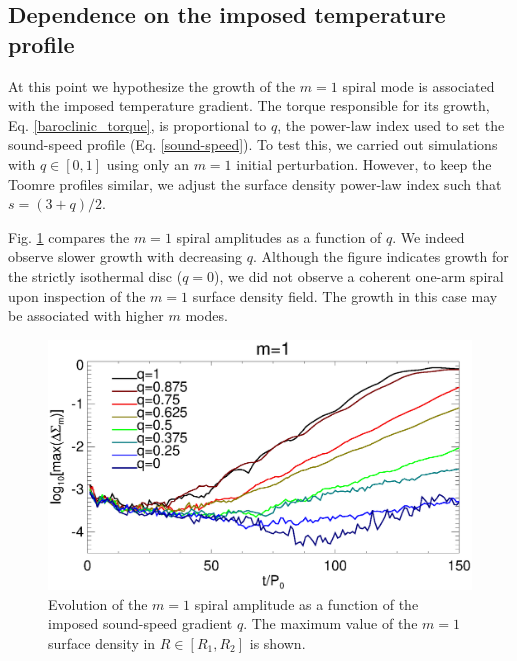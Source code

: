 
\subsection{Dependence on the imposed temperature profile} 
At this point we hypothesize the growth of the $m=1$ spiral mode is
associated with the imposed temperature gradient. The torque
responsible for its growth, Eq. \ref{baroclinic_torque}, is
proportional to $q$, the power-law index used to set the sound-speed
profile (Eq. \ref{sound-speed}). To test this, we carried out
simulations with $q\in[0,1]$ using only an $m=1$ initial 
perturbation. However, to keep the Toomre profiles similar, we adjust
the surface density power-law index such that $s = (3+q)/2$. 

Fig. \ref{fargo_varq} compares the $m=1$ spiral amplitudes as a
function of $q$. We indeed observe slower growth with decreasing
$q$. Although the figure indicates growth for the strictly isothermal
disc ($q=0$), we did not observe a coherent one-arm spiral upon
inspection of the $m=1$ surface density field. The growth in this case
may be associated with higher $m$ modes.  

\begin{figure}
  \includegraphics[width=\linewidth]{figures/m1_analysis_plot_fargo_varq.ps}   
  \caption{Evolution of the $m=1$ spiral amplitude as a function of
    the imposed sound-speed gradient $q$. The maximum value of the
    $m=1$ surface density in $R\in[R_1,R_2]$ is shown. 
    \label{fargo_varq}} 
\end{figure}


